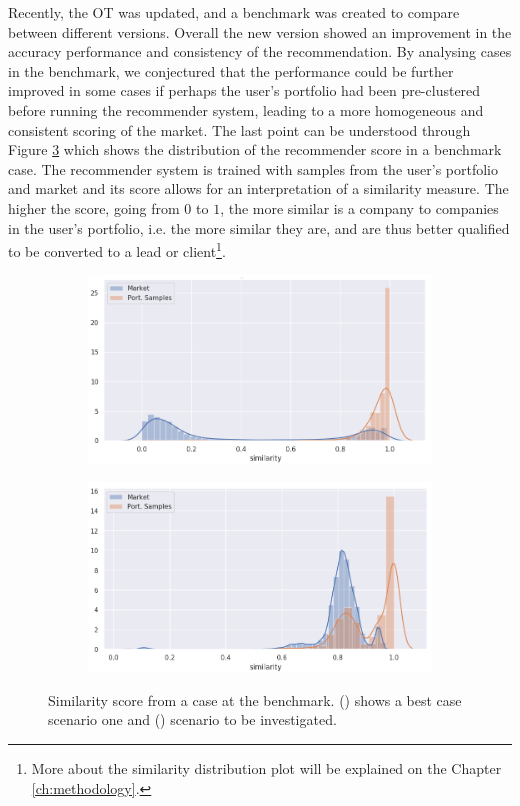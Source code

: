Recently, the OT was updated, and a benchmark was created to compare between different versions. Overall the new version showed an improvement in the accuracy performance and consistency of the recommendation. By analysing cases in the benchmark, we conjectured that the performance could be further improved in some cases if perhaps the user's portfolio had been pre-clustered before running the recommender system, leading to a more homogeneous and consistent scoring of the market. The last point can be understood through Figure \ref{fig:simi-dist} which shows the distribution of the recommender score in a benchmark case. The recommender system is trained with samples from the user's portfolio and market and its score allows for an interpretation of a similarity measure. The higher the score, going from $0$ to $1$, the more similar is a company to companies in the user's portfolio, i.e. the more similar they are, and are thus better qualified to be converted to a lead or client\footnote{More about the similarity distribution plot will be explained on the Chapter \ref{ch:methodology}.}.

\begin{figure}[!ht]
    \begin{subfigure}{\linewidth}
        \centering
        \includegraphics[width=10cm]{fig/ch1-simi-dist-expected.png}
        \caption{}
        \label{fig:simi-dist:expected}
    \end{subfigure}
    \begin{subfigure}{\linewidth}
        \centering
        \includegraphics[width=10cm]{fig/ch1-simi-dist-to-investigate.png}
        \caption{}
        \label{fig:simi-dist:to-investigate}
    \end{subfigure}
    \caption{Similarity score from a case at the benchmark. () shows a best case scenario one and () scenario to be investigated.}
    \label{fig:simi-dist}
\end{figure}

